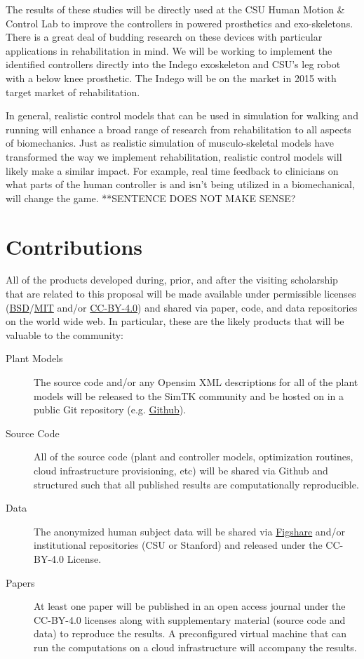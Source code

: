 \documentclass[11pt]{article}
\begin{document}
The results of these studies will be directly used at the CSU Human Motion \&
Control Lab to improve the controllers in powered prosthetics and
exo-skeletons.  There is a great deal of budding research on these devices with
particular applications in rehabilitation in mind. We will be working to
implement the identified controllers directly into the Indego exoskeleton and
CSU's leg robot with a below knee prosthetic. The Indego will be on the market
in 2015 with target market of rehabilitation.

In general, realistic control models that can be used in simulation for
walking and running will enhance a broad range of research from rehabilitation
to all aspects of biomechanics. Just as realistic simulation of
musculo-skeletal models have transformed the way we implement rehabilitation,
realistic control models will likely make a similar impact. For example,
real time feedback to clinicians on what parts of the human controller is and
isn't being utilized in a biomechanical, will change the game. **SENTENCE DOES NOT MAKE SENSE?

\section*{Contributions}

All of the products developed during, prior, and after the visiting scholarship
that are related to this proposal will be made available under permissible
licenses
(\href{http://opensource.org/licenses/BSD-2-Clause}{BSD}/\href{http://opensource.org/licenses/MIT}{MIT}
and/or \href{http://creativecommons.org/licenses/by/4.0/}{CC-BY-4.0}) and
shared via paper, code, and data repositories on the world wide web. In
particular, these are the likely products that will be valuable to the
community:

\begin{description}
  \item[Plant Models] The source code and/or any Opensim XML descriptions for
    all of the plant models will be released to the SimTK community and be
    hosted on in a public Git repository (e.g.
    \href{http://github.com}{Github}).
  \item[Source Code] All of the source code (plant and controller models,
    optimization routines, cloud infrastructure provisioning, etc) will be
    shared via Github and structured such that all published results are
    computationally reproducible.
  \item[Data] The anonymized human subject data will be shared via
    \href{http://figshare.com}{Figshare} and/or institutional repositories (CSU
    or Stanford) and released under the CC-BY-4.0 License.
  \item[Papers] At least one paper will be published in an open access journal
    under the CC-BY-4.0 licenses along with supplementary material (source code
    and data) to reproduce the results. A preconfigured virtual machine that
    can run the computations on a cloud infrastructure will accompany the
    results.
\end{description}
\end{document}
